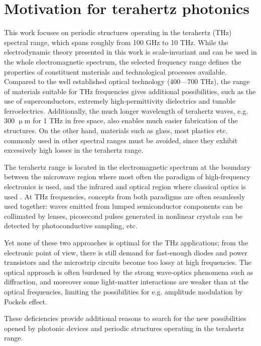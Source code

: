 \section{Motivation for terahertz photonics} %
This work focuses on periodic structures operating in the terahertz (THz) spectral range, which spans roughly from 100 GHz to 10 THz. While the electrodynamic theory presented in this work is scale-invariant and can be used in the whole electromagnetic spectrum, the selected frequency range defines the properties of constituent materials and technological processes available. Compared to the well established optical technology (400---700 THz), the range of materials suitable for THz frequencies gives additional possibilities, such as the use of superconductors, extremely high-permittivity dielectrics and tunable ferroelectrics. Additionally, the much longer wavelength of terahertz waves, e.g. 300 $\upmu$m for 1 THz in free space, also enables much easier fabrication of the structures. On the other hand, materials such as glass, most plastics etc. commonly used in other spectral ranges must be avoided, since they exhibit excessively high losses in the terahertz range.

The terahertz range is located in the electromagnetic spectrum at the boundary between the microwave region where most often the paradigm of high-frequency electronics is used, and the infrared and optical region where classical optics is used \cite{ozyuzer2007emission}. At THz frequencies, concepts from both paradigms are often seamlessly used together: waves emitted from lumped semiconductor components can be collimated by lenses, picosecond pulses generated in nonlinear crystals can be detected by photoconductive sampling, etc.  %

Yet none of these two approaches is optimal for the THz applications; from the electronic point of view, there is still demand for fast-enough diodes and power transistors and the microstrip circuits become too lossy at high frequencies. The optical approach is often burdened by the strong wave-optics phenomena such as diffraction, and moreover some light-matter interactions are weaker than at the optical frequencies, limiting the possibilities for e.g. amplitude modulation by Pockels effect. 

These deficiencies provide additional reasons to search for the new possibilities opened by photonic devices and periodic structures operating in the terahertz range.  

